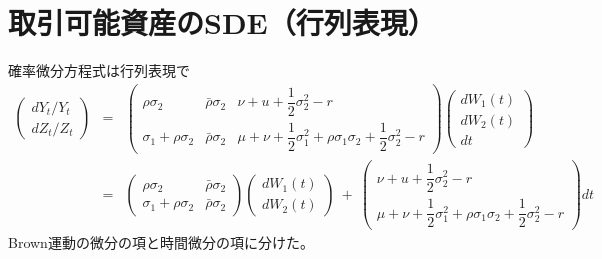 \documentclass[uplatex,a4j,12pt,dvipdfmx]{jsarticle}
\begin{document}
\section{取引可能資産のSDE（行列表現）}
確率微分方程式は行列表現で
%
%
\begin{eqnarray}
	\left(
	\begin{array}{c}
		d Y_{t} / Y_{t}
		\\[2mm]
		d Z_{t} / Z_{t}
	\end{array}
	\right)
	&=&
	\left(
	\begin{array}{ccc}
		\rho \sigma_{2}              & \bar{\rho} \sigma_{2} & \nu + u + \dfrac{1}{2} \sigma_{2}^{2} - r
		\\
		\sigma_{1} + \rho \sigma_{2} & \bar{\rho} \sigma_{2} & \mu + \nu + \dfrac{1}{2} \sigma_{1}^{2} + \rho \sigma_{1} \sigma_{2} + \dfrac{1}{2} \sigma_{2}^{2} - r
	\end{array}
	\right)
	\left(
	\begin{array}{c}
		dW_{1}(t)
		\\
		dW_{2}(t)
		\\
		dt
	\end{array}
	\right)
	\\ &=&
	\left(
	\begin{array}{cc}
		\rho \sigma_{2}              & \bar{\rho} \sigma_{2}
		\\
		\sigma_{1} + \rho \sigma_{2} & \bar{\rho} \sigma_{2}
	\end{array}
	\right)
	\left(
	\begin{array}{c}
		dW_{1}(t)
		\\
		dW_{2}(t)
	\end{array}
	\right)
	\ + \
	\left(
	\begin{array}{c}
		\nu + u + \dfrac{1}{2} \sigma_{2}^{2} - r
		\\
		\mu + \nu + \dfrac{1}{2} \sigma_{1}^{2} + \rho \sigma_{1} \sigma_{2} + \dfrac{1}{2} \sigma_{2}^{2} - r
	\end{array}
	\right)
	dt
\end{eqnarray}
%
%
Brown運動の微分の項と時間微分の項に分けた。
\end{document}

